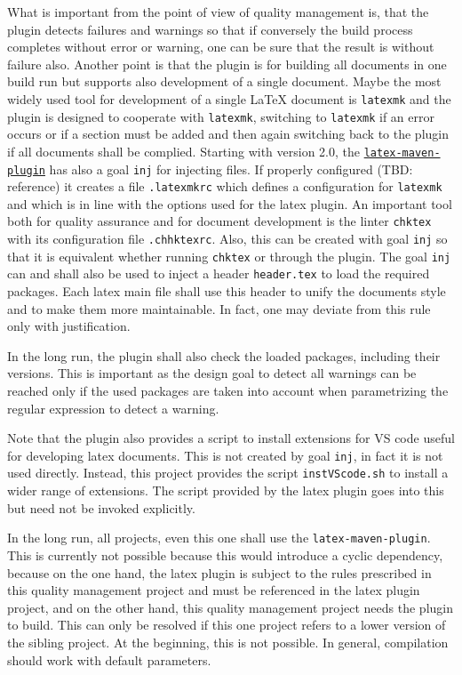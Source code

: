 \documentclass[a4paper,12pt]{article}
\begin{document}
What is important from the point of view of quality management is, 
that the plugin detects failures and warnings so 
that if conversely the build process completes without error or warning, 
one can be sure that the result is without failure also. 
Another point is that the plugin is for building all documents in one build run 
but supports also development of a single document. 
Maybe the most widely used tool for development of a single \LaTeX{} document 
is \texttt{latexmk} and the plugin is designed to cooperate with \texttt{latexmk}, 
switching to \texttt{latexmk} if an error occurs or if a section must be added 
and then again switching back to the plugin if all documents shall be complied. 
Starting with version 2.0, 
the \href{https://github.com/Reissner/latex-maven-plugin}{\texttt{latex-maven-plugin}} 
has also a goal \texttt{inj} for injecting files. 
If properly configured (TBD\@: reference) it creates a file \texttt{.latexmkrc} 
which defines a configuration for \texttt{latexmk} 
and which is in line with the options used for the latex plugin. 
An important tool both for quality assurance and for document development 
is the linter \texttt{chktex} with its configuration file \texttt{.chhktexrc}. 
Also, this can be created with goal \texttt{inj} 
so that it is equivalent whether running \texttt{chktex} or through the plugin. 
The goal \texttt{inj} can and shall also be used to inject a header \texttt{header.tex} 
to load the required packages. 
Each latex main file shall use this header 
to unify the documents style and to make them more maintainable. 
In fact, one may deviate from this rule only with justification. 

In the long run, the plugin shall also check the loaded packages, 
including their versions. 
This is important as the design goal to detect all warnings 
can be reached only if the used packages are taken into account 
when parametrizing the regular expression to detect a warning. 

Note that the plugin also provides a script 
to install extensions for VS code useful for developing latex documents. 
This is not created by goal \texttt{inj}, 
in fact it is not used directly. 
Instead, this project provides the script \texttt{instVScode.sh} 
to install a wider range of extensions. 
The script provided by the latex plugin 
goes into this but need not be invoked explicitly. 






In the long run, 
all projects, even this one shall use the \texttt{latex-maven-plugin}. 
This is currently not possible because this would introduce a cyclic dependency, 
because on the one hand, the latex plugin is subject to the rules 
prescribed in this quality management project 
and must be referenced in the latex plugin project, 
and on the other hand, 
this quality management project needs the plugin to build. 
This can only be resolved if this one project 
refers to a lower version of the sibling project. 
At the beginning, this is not possible. 
In general, compilation should work with default parameters. 
\end{document}

